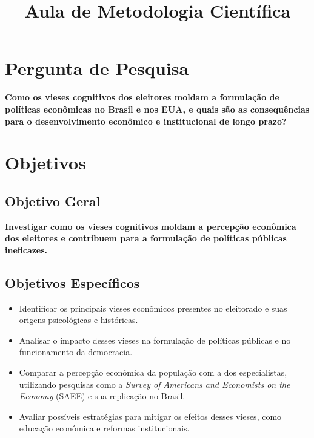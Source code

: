 \documentclass[
	article,
	12pt,
	oneside,
	a4paper,
	english,
	brazil,
	sumario=tradicional
]{abntex2}
\title{Aula de Metodologia Científica}
\begin{document}
\chapter{Pergunta de Pesquisa}



\textbf{Como os vieses cognitivos dos eleitores moldam a formulação de políticas econômicas no Brasil e nos EUA, e quais são as consequências para o desenvolvimento econômico e institucional de longo prazo?}

\newpage
\chapter{Objetivos}

\section{Objetivo Geral}

\textbf{Investigar como os vieses cognitivos moldam a percepção econômica dos eleitores e contribuem para a formulação de políticas públicas ineficazes.}

\section{Objetivos Específicos}

\begin{itemize}
  \item Identificar os principais vieses econômicos presentes no eleitorado e suas origens psicológicas e históricas.
  \item Analisar o impacto desses vieses na formulação de políticas públicas e no funcionamento da democracia.
  \item Comparar a percepção econômica da população com a dos especialistas, utilizando pesquisas como a \textit{Survey of Americans and Economists on the Economy} (SAEE) e sua replicação no Brasil.
  \item Avaliar possíveis estratégias para mitigar os efeitos desses vieses, como educação econômica e reformas institucionais.
\end{itemize}

\newpage
\end{document}
